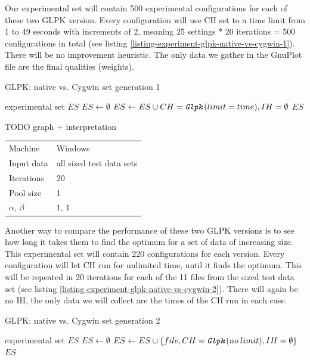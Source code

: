 Our experimental set will contain 500 experimental configurations for each of these two GLPK version. Every configuration will use  CH set to a time limit from 1 to 49 seconds with increments of 2, meaning 25 settings * 20 iterations = 500 configurations in total (see listing \ref{listing-experiment-glpk-native-vs-cygwin-1}). There will be no improvement heuristic. The only data we gather in the GnuPlot file are the final qualities (weights).

\begin{algorithm}
\caption{GLPK: native vs. Cygwin set generation 1}
\label{listing-experiment-glpk-native-vs-cygwin-1}
\begin{algorithmic}
\ENSURE experimental set $ES$
\STATE $ES \gets \emptyset$
    \STATE $ES \gets ES \cup {CH = \texttt{\textit{Glpk}}(limit = time), IH = \emptyset}$
  \ENDFOR
\ENDFOR
\RETURN $ES$
\end{algorithmic}
\end{algorithm}

TODO graph + interpretation

\begin{center}
\bigskip
\begin{tabular}{| l | l |}
  \hline
  \hline
  Machine           & Windows \\
  Input data        & all sized test data sets \\
  Iterations        & 20 \\
  Pool size         & 1 \\
  $\alpha$, $\beta$ & $1$, $1$ \\
  \hline
\end{tabular}
\bigskip
\end{center}

Another way to compare the performance of these two GLPK versions is to see how long it takes them to find the optimum for a set of data of increasing size. This experimental set will contain 220 configurations for each version. Every configuration will let  CH run for unlimited time, until it finds the optimum. This will be repeated in 20 iterations for each of the 11 files from the sized test data set (see listing \ref{listing-experiment-glpk-native-vs-cygwin-2}). There will again be no IH, the only data we will collect are the times of the CH run in each case.

\begin{algorithm}
\caption{GLPK: native vs. Cygwin set generation 2}
\label{listing-experiment-glpk-native-vs-cygwin-2}
\begin{algorithmic}
\ENSURE experimental set $ES$
\STATE $ES \gets \emptyset$
    \STATE $ES \gets ES \cup \{file, CH = \texttt{\textit{Glpk}}(no\:limit), IH = \emptyset\}$
  \ENDFOR
\ENDFOR
\RETURN $ES$
\end{algorithmic}
\end{algorithm}

